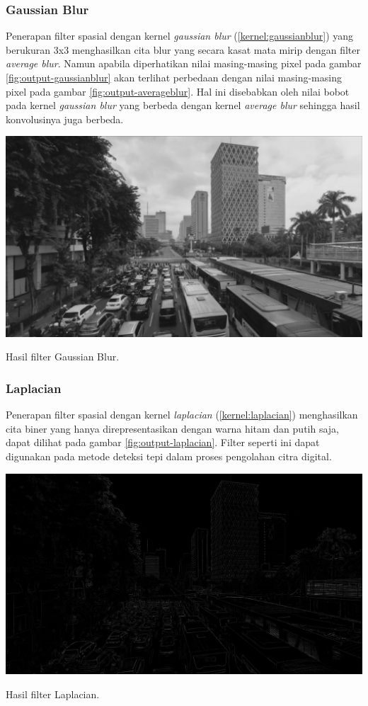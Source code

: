 \subsubsection{Gaussian Blur}
Penerapan filter spasial dengan kernel \textit{gaussian blur} (\ref{kernel:gaussianblur}) yang berukuran 3x3 menghasilkan cita blur yang secara kasat mata mirip dengan filter \textit{average blur}. Namun apabila diperhatikan nilai masing-masing pixel pada gambar \ref{fig:output-gaussianblur} akan terlihat perbedaan dengan nilai masing-masing pixel pada gambar \ref{fig:output-averageblur}. Hal ini disebabkan oleh nilai bobot pada kernel \textit{gaussian blur} yang berbeda dengan kernel \textit{average blur} sehingga hasil konvolusinya juga berbeda. 
\begin{afigure}
    \includegraphics[width=0.8\linewidth, center]{images/output-image/input1-gaussianblur.png}
    \caption{Hasil filter Gaussian Blur.}
    \label{fig:output-gaussianblur}
\end{afigure}

\subsubsection{Laplacian}
Penerapan filter spasial dengan kernel \textit{laplacian} (\ref{kernel:laplacian}) menghasilkan cita biner yang hanya direpresentasikan dengan warna hitam dan putih saja, dapat dilihat pada gambar \ref{fig:output-laplacian}. Filter seperti ini dapat digunakan pada metode deteksi tepi dalam proses pengolahan citra digital.
\begin{afigure}
    \includegraphics[width=0.8\linewidth, center]{images/output-image/input1-laplacian.png}
    \caption{Hasil filter Laplacian.}
    \label{fig:output-laplacian}
\end{afigure}

